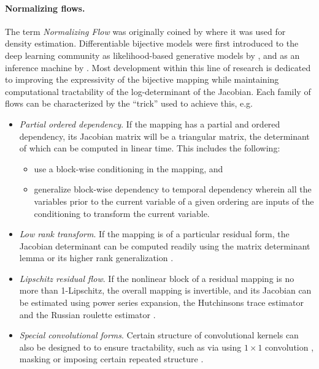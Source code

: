 \documentclass{article}
\begin{document}
\paragraph{Normalizing flows.}
The term \emph{Normalizing Flow} was originally coined by \citet{tabak2010density,tabak2013family} where it was used for density estimation.
Differentiable bijective models were first introduced to the deep learning community as likelihood-based generative models by \citet{rippel2013high,dinh2014nice}, and as an inference machine by \citet{rezende2015variational}. 
Most development within this line of research is dedicated to improving the expressivity of the bijective mapping while maintaining computational tractability of the log-determinant of the Jacobian. 
Each family of flows can be characterized by the ``trick'' used to achieve this, e.g.
\begin{itemize}
\item \emph{Partial ordered dependency}. 
If the mapping has a partial and ordered dependency, its Jacobian matrix will be a triangular matrix, the determinant of which can be computed in linear time. This includes the following:
\begin{itemize}
    \item \citet{dinh2014nice,dinh2016density,kingma2018glow,ho2019flow++} use a block-wise conditioning in the mapping, and
    \item \citet{kingma2016improved,chen2016variational, papamakarios2017masked,huang2018neural} generalize block-wise dependency to temporal dependency wherein all the variables prior to the current variable of a given ordering are inputs of the conditioning to transform the current variable.
\end{itemize}
\item \emph{Low rank transform}.
If the mapping is of a particular residual form, the Jacobian determinant can be computed readily using the matrix determinant lemma \citep{rezende2015variational}
or its higher rank generalization \citep{berg2018sylvester}.
\item \emph{Lipschitz residual flow}. If the nonlinear block of a residual mapping is no more than 1-Lipschitz, the overall mapping is invertible, and its Jacobian can be estimated using power series expansion, the Hutchinsons trace estimator \citep{behrmann2018invertible} and the Russian roulette estimator \citep{chen2019residualflows}. 
\item \emph{Special convolutional forms}. Certain structure of convolutional kernels can also be designed to to ensure tractability, such as via using $1\times1$ convolution \citep{kingma2018glow}, masking \citep{oord2016pixel,NIPS2016_6527,hoogeboom2019emerging,song2019mintnet,ma2019macow} or imposing certain repeated structure \citep{karami2019invertible}.
\end{itemize}
\end{document}
